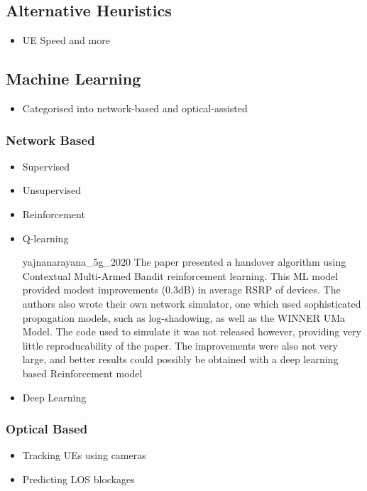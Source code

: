 \subsection{Alternative Heuristics}
\begin{itemize}
    \item UE Speed and more
\end{itemize}
\subsection{Machine Learning}
\begin{itemize}
    \item Categorised into network-based and optical-assisted
\end{itemize}
\subsubsection{Network Based}
\begin{itemize}
    \item Supervised
    \item Unsupervised
    \item Reinforcement
    \setlength{\itemindent}{2em}
    \item Q-learning
    \item[{yajnanarayana_5g_2020}] The paper presented a handover algorithm using Contextual Multi-Armed Bandit reinforcement learning. This ML model provided modest improvements (0.3dB) in average RSRP of devices. The authors also wrote their own network simulator, one which used sophisticated propagation models, such as log-shadowing, as well as the WINNER UMa Model. The code used to simulate it was not released however, providing very little reproducability of the paper. The improvements were also not very large, and better results could possibly be obtained with a deep learning based Reinforcement model
    \item Deep Learning
\end{itemize}
\subsubsection{Optical Based}
\begin{itemize}
    \item Tracking UEs using cameras
    \item Predicting LOS blockages
\end{itemize}

